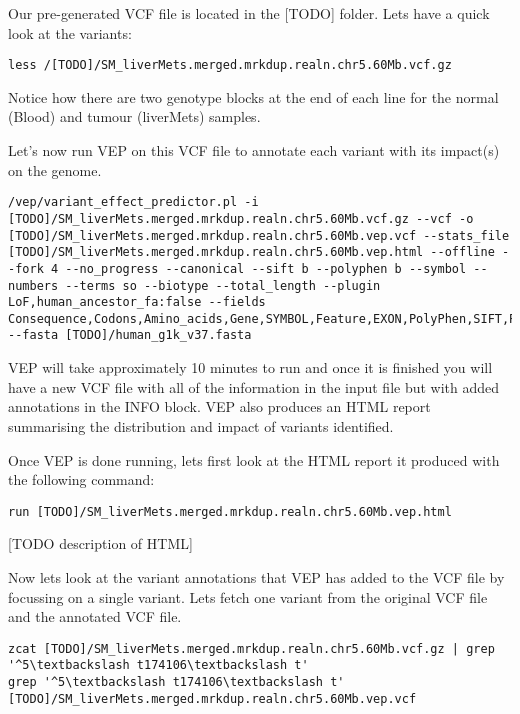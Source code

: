 \begin{steps}
Our pre-generated VCF file is located in the [TODO] folder. Lets have a quick look at the variants:
\begin{lstlisting}
less /[TODO]/SM_liverMets.merged.mrkdup.realn.chr5.60Mb.vcf.gz
\end{lstlisting}
\end{steps}

Notice how there are two genotype blocks at the end of each line for the normal (Blood) and tumour (liverMets) samples.

Let's now run VEP on this VCF file to annotate each variant with its impact(s) on the genome.

\begin{steps}
\begin{lstlisting}
/vep/variant_effect_predictor.pl -i [TODO]/SM_liverMets.merged.mrkdup.realn.chr5.60Mb.vcf.gz --vcf -o [TODO]/SM_liverMets.merged.mrkdup.realn.chr5.60Mb.vep.vcf --stats_file [TODO]/SM_liverMets.merged.mrkdup.realn.chr5.60Mb.vep.html --offline --fork 4 --no_progress --canonical --sift b --polyphen b --symbol --numbers --terms so --biotype --total_length --plugin LoF,human_ancestor_fa:false --fields Consequence,Codons,Amino_acids,Gene,SYMBOL,Feature,EXON,PolyPhen,SIFT,Protein_position,BIOTYPE,CANONICAL,Feature_type,cDNA_position,CDS_position,Existing_variation,DISTANCE,STRAND,CLIN_SIG,LoF_flags,LoF_filter,LoF,RadialSVM_score,RadialSVM_pred,LR_score,LR_pred,CADD_raw,CADD_phred,Reliability_index,HGVSc,HGVSp --fasta [TODO]/human_g1k_v37.fasta
\end{lstlisting}
\end{steps}

VEP will take approximately 10 minutes to run and once it is finished you will have a new VCF file with all of the information in the input file but with added annotations in the INFO block. VEP also produces an HTML report summarising the distribution and impact of variants identified.

\begin{steps}
Once VEP is done running, lets first look at the HTML report it produced with the following command:
\begin{lstlisting}
run [TODO]/SM_liverMets.merged.mrkdup.realn.chr5.60Mb.vep.html
\end{lstlisting}
\end{steps}

[TODO description of HTML]

\begin{steps}
Now lets look at the variant annotations that VEP has added to the VCF file by focussing on a single variant. Lets fetch one variant from the original VCF file and the annotated VCF file.
\begin{lstlisting}
zcat [TODO]/SM_liverMets.merged.mrkdup.realn.chr5.60Mb.vcf.gz | grep '^5\textbackslash t174106\textbackslash t'
grep '^5\textbackslash t174106\textbackslash t' [TODO]/SM_liverMets.merged.mrkdup.realn.chr5.60Mb.vep.vcf
\end{lstlisting}
\end{steps}

